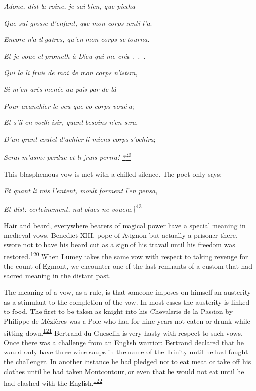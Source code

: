 \emph{Adonc, dist la roine, je sai bien, que piecha}

\emph{Que sui grosse d'enfant, que mon corps senti l'a}.

\emph{Encore n'a il gaires, qu'en mon corps se tourna}.

\emph{Et je voue et prometh à Dieu qui me créa .~.~}.

\emph{Qui la li fruis de moi de mon corps n'istera},

\emph{Si m'en arés menée au païs par de-là}

\emph{Pour avanchier le veu que vo corps voué a};

\emph{\protect\hypertarget{10_Chapter_Three__THE_HEROIC_DREAM.xhtmlux5cux23page_100}{}{}Et
s'il en voelh isir, quant besoins n'en sera},

\emph{D'un grant coutel d'achier li miens corps s'ochira};

\emph{Serai m'asme perdue et li fruis perira!
\protect\hypertarget{10_Chapter_Three__THE_HEROIC_DREAM.xhtmlux5cux23id_2871}{\protect\hyperlink{23_NOTES.xhtmlux5cux23id_2872}{*\textsuperscript{42}}}}

This blasphemous vow is met with a chilled silence. The poet only says:

\emph{Et quant li rois l'entent, moult forment l'en pensa},

\emph{Et dist: certainement, nul plues ne
vouera}.\protect\hypertarget{10_Chapter_Three__THE_HEROIC_DREAM.xhtmlux5cux23id_2873}{\protect\hyperlink{23_NOTES.xhtmlux5cux23id_2874}{†\textsuperscript{43}}}

Hair and beard, everywhere bearers of magical power have a special
meaning in medieval vows. Benedict XIII, pope of Avignon but actually a
prisoner there, swore not to have his beard cut as a sign of his travail
until his freedom was
restored.\textsuperscript{\protect\hypertarget{10_Chapter_Three__THE_HEROIC_DREAM.xhtmlux5cux23id_1695}{\protect\hyperlink{23_NOTES.xhtmlux5cux23id_1696}{120}}}
When Lumey takes the same vow with respect to taking revenge for the
count of Egmont, we encounter one of the last remnants of a custom that
had sacred meaning in the distant past.

The meaning of a vow, as a rule, is that someone imposes on himself an
austerity as a stimulant to the completion of the vow. In most cases the
austerity is linked to food. The first to be taken as knight into his
Chevalerie de la Passion by Philippe de Mézières was a Pole who had for
nine years not eaten or drunk while sitting
down.\textsuperscript{\protect\hypertarget{10_Chapter_Three__THE_HEROIC_DREAM.xhtmlux5cux23id_1693}{\protect\hyperlink{23_NOTES.xhtmlux5cux23id_1694}{121}}}
Bertrand du Guesclin is very hasty with respect to such vows. Once there
was a challenge from an English warrior: Bertrand declared that he would
only have three wine soups in the name of the Trinity until he had
fought the challenger. In another instance he had pledged not to eat
meat or take off his clothes until he had taken Montcontour, or even
that he would not eat until he had clashed with the
English.\textsuperscript{\protect\hypertarget{10_Chapter_Three__THE_HEROIC_DREAM.xhtmlux5cux23id_1691}{\protect\hyperlink{23_NOTES.xhtmlux5cux23id_1692}{122}}}

